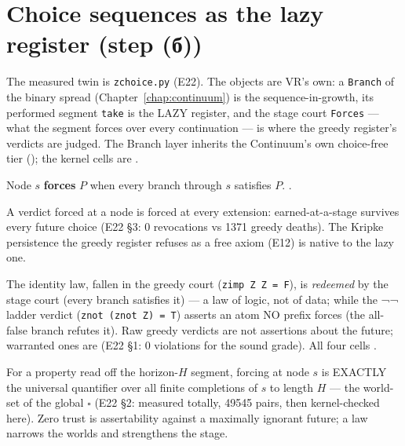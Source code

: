\section{Choice sequences as the lazy register (step (б))}
\label{sec:setsztl_stages}

The measured twin is \texttt{zchoice.py} (E22).  The objects are VR's own:
a \texttt{Branch} of the binary spread (Chapter~\ref{chap:continuum}) is the
sequence-in-growth, its performed segment \texttt{take} is the LAZY register,
and the stage court \texttt{Forces} --- what the segment forces over every
continuation --- is where the greedy register's verdicts are judged.  The
Branch layer inherits the Continuum's own choice-free tier
(); the kernel cells are
\axiomprofile{[]}.

\begin{definition}
\label{def:setsztl_forces}
\leanok
Node $s$ \textbf{forces} $P$ when every branch through $s$ satisfies $P$.
\axiomprofile{[]}.
\end{definition}

\begin{theorem}
\label{thm:setsztl_heredity}
\leanok
{}
A verdict forced at a node is forced at every extension: earned-at-a-stage
survives every future choice (E22 §3: 0 revocations vs 1371 greedy deaths).
The Kripke persistence the greedy register refuses as a free axiom (E12) is
native to the lazy one.
\end{theorem}

\begin{theorem}
\label{thm:setsztl_ladder}
\leanok
{}
The identity law, fallen in the greedy court
(\texttt{zimp Z Z = F}), is \emph{redeemed} by the stage court (every branch
satisfies it) --- a law of logic, not of data; while the ¬¬ ladder verdict
(\texttt{znot (znot Z) = T}) asserts an atom NO prefix forces (the all-false
branch refutes it).  Raw greedy verdicts are not assertions about the future;
warranted ones are (E22 §1: 0 violations for the sound grade).  All four
cells \axiomprofile{[]}.
\end{theorem}

\begin{theorem}[Lawless stage = global supervaluation]
\label{thm:setsztl_super}
\leanok
{}
For a property read off the horizon-$H$ segment, forcing at node $s$ is
EXACTLY the universal quantifier over all finite completions of $s$ to
length $H$ --- the world-set of the global $\square$ (E22 §2: measured
totally, 49545 pairs, then kernel-checked here).  Zero trust is
assertability against a maximally ignorant future; a law narrows the worlds
and strengthens the stage.
\end{theorem}

